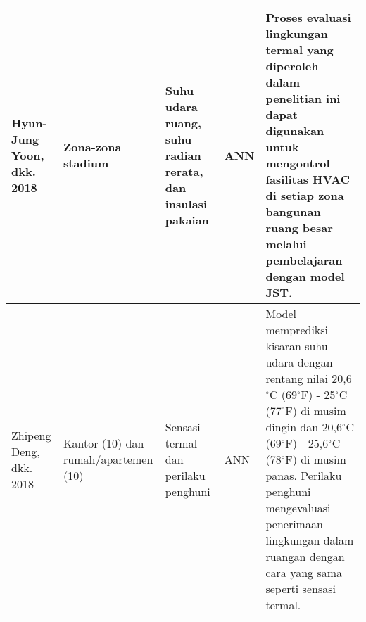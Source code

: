 \begin{landscape}
\begin{table}[hbt!]
\begin{tabular}{|p{2.8cm}|p{3cm}|p{2.8cm}|p{3.5cm}|p{9.8cm}|}
			Hyun-Jung Yoon, dkk. 2018 \cite{article16} & Zona-zona stadium & Suhu udara ruang, suhu radian rerata, dan insulasi pakaian & ANN & Proses evaluasi lingkungan termal yang diperoleh dalam penelitian ini dapat digunakan untuk mengontrol fasilitas HVAC di setiap zona bangunan ruang besar melalui pembelajaran dengan model JST. \\ \hline
			
			Zhipeng Deng, dkk. 2018 \cite{article17} & Kantor (10) dan rumah/apartemen (10) & Sensasi termal dan perilaku penghuni & ANN & Model memprediksi kisaran suhu udara dengan rentang nilai 20,6$^{\circ}$C (69$^{\circ}$F) - 25$^{\circ}$C (77$^{\circ}$F) di musim dingin dan 20,6$^{\circ}$C (69$^{\circ}$F) - 25,6$^{\circ}$C (78$^{\circ}$F) di musim panas. Perilaku penghuni mengevaluasi penerimaan lingkungan dalam ruangan dengan cara yang sama seperti sensasi termal.\\ \hline
		\end{tabular}
	\end{table}
\end{landscape}